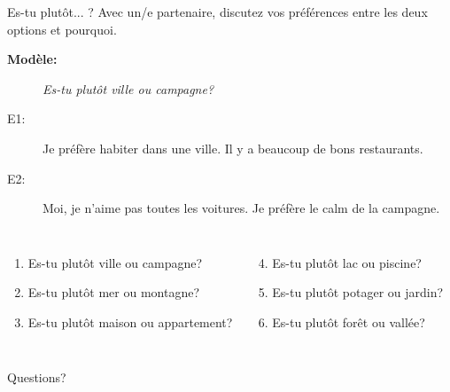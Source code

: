 \documentclass{beamer}
\begin{document}
  \begin{frame}{Es-tu plutôt... ?}
    Avec un/e partenaire, discutez vos préférences entre les deux options et pourquoi.
    \begin{description}
      \item[\textbf{Modèle:}] \textit{Es-tu plutôt ville ou campagne?}
      \item[E1:] Je préfère habiter dans une ville. Il y a beaucoup de bons restaurants.
      \item[E2:] Moi, je n'aime pas toutes les voitures. Je préfère le calm de la campagne.
    \end{description}
    \begin{columns}[t]
        \begin{enumerate}
          \item Es-tu plutôt ville ou campagne?
          \item Es-tu plutôt mer ou montagne?
          \item Es-tu plutôt maison ou appartement?
        \end{enumerate}
        \begin{enumerate}
          \setcounter{enumi}{3}
          \item Es-tu plutôt lac ou piscine?
          \item Es-tu plutôt potager ou jardin?
          \item Es-tu plutôt forêt ou vallée?
        \end{enumerate}
    \end{columns}
  \end{frame}

  \begin{frame}{}
    \begin{center}
      \Large Questions?
    \end{center}
  \end{frame}
\end{document}
